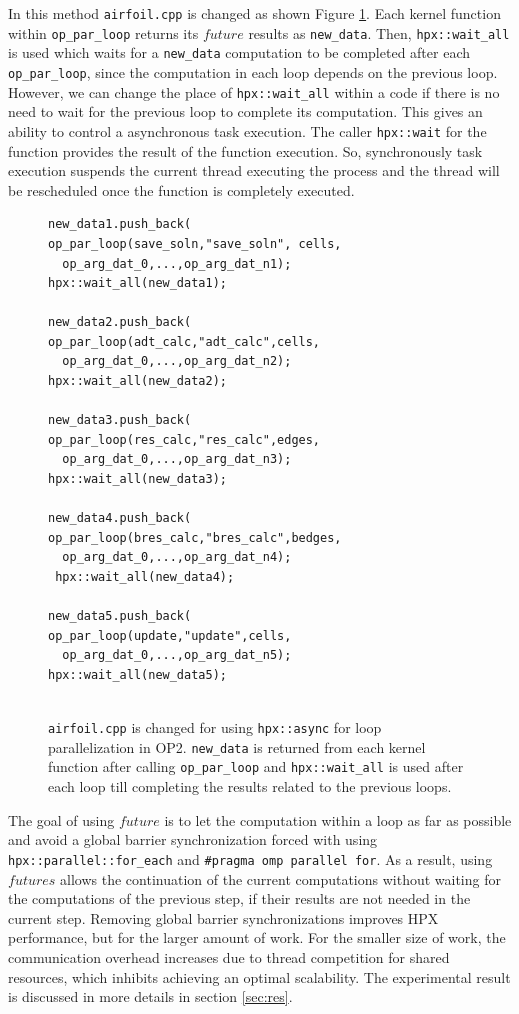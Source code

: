\documentclass[conference]{IEEEtran}
\begin{document}
In this method \texttt{airfoil.cpp} is changed as shown Figure \ref{l4}. Each kernel function within \texttt{op\_par\_loop} returns its $future$ results as \texttt{new\_data}. Then, \texttt{hpx::wait\_all} is used which waits for a \texttt{new\_data} computation to be completed after each \texttt{op\_par\_loop}, since the computation in each loop depends on the previous loop. However, we can change the place of \texttt{hpx::wait\_all} within a code if there is no need to wait for the previous loop to complete its computation. This gives an ability to control a asynchronous task execution. The caller \texttt{hpx::wait} for the function provides the result of the function execution. So, synchronously task execution suspends the current thread executing the process and the thread will be rescheduled once the function is completely executed. 

\begin{figure}
    \begin{lstlisting}
new_data1.push_back(
op_par_loop(save_soln,"save_soln", cells,
  op_arg_dat_0,...,op_arg_dat_n1);
hpx::wait_all(new_data1);
  
new_data2.push_back(
op_par_loop(adt_calc,"adt_calc",cells,
  op_arg_dat_0,...,op_arg_dat_n2);
hpx::wait_all(new_data2);
   
new_data3.push_back(
op_par_loop(res_calc,"res_calc",edges,
  op_arg_dat_0,...,op_arg_dat_n3);
hpx::wait_all(new_data3);
 
new_data4.push_back(
op_par_loop(bres_calc,"bres_calc",bedges,
  op_arg_dat_0,...,op_arg_dat_n4);
 hpx::wait_all(new_data4);
   
new_data5.push_back(
op_par_loop(update,"update",cells,
  op_arg_dat_0,...,op_arg_dat_n5);
hpx::wait_all(new_data5);
   
    \end{lstlisting}
    \caption{\small{\texttt{airfoil.cpp} is changed for using \texttt{hpx::async} for loop parallelization in OP2. \texttt{new\_data} is returned from each kernel function after calling \texttt{op\_par\_loop} and \texttt{hpx::wait\_all} is used after each loop till completing the results related to the previous loops.}}
    \label{l4}
\end{figure}



The goal of using $future$ is to let the computation within a loop as far as possible and avoid a global barrier synchronization forced with using  \texttt{hpx::parallel::for\_each} and \texttt{\#pragma omp parallel for}. As a result, using $futures$ allows the continuation of the current computations without waiting for the computations of the previous step, if their results are not needed in the current step. Removing global barrier synchronizations improves HPX performance, but for the larger amount of work. For the smaller size of work, the communication overhead increases due to thread competition for shared resources, which inhibits achieving an optimal scalability. The experimental result is discussed in more details in section \ref{sec:res}.
\end{document}
